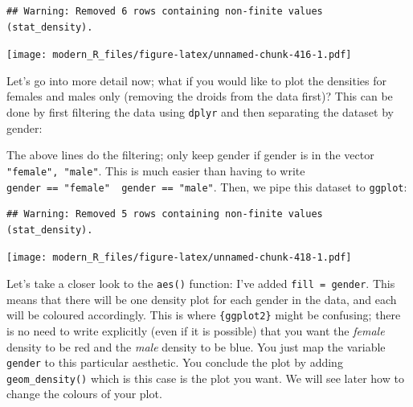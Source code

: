 \documentclass[]{gitbook}
\newenvironment{Shaded}{\begin{snugshade}}{\end{snugshade}}
\newcommand{\DataTypeTok}[1]{\textcolor[rgb]{0.13,0.29,0.53}{#1}}
\newcommand{\KeywordTok}[1]{\textcolor[rgb]{0.13,0.29,0.53}{\textbf{#1}}}
\newcommand{\NormalTok}[1]{#1}
\newcommand{\OperatorTok}[1]{\textcolor[rgb]{0.81,0.36,0.00}{\textbf{#1}}}
\newcommand{\StringTok}[1]{\textcolor[rgb]{0.31,0.60,0.02}{#1}}
\begin{document}
\begin{verbatim}
## Warning: Removed 6 rows containing non-finite values (stat_density).
\end{verbatim}

\texttt{[image: modern\_R\_files/figure-latex/unnamed-chunk-416-1.pdf]}

Let's go into more detail now; what if you would like to plot the densities for females and males
only (removing the droids from the data first)? This can be done by first filtering the data using
\texttt{dplyr} and then separating the dataset by gender:

\begin{Shaded}
\end{Shaded}

The above lines do the filtering; only keep gender if gender is in the vector \texttt{"female",\ "male"}.
This is much easier than having to write \texttt{gender\ ==\ "female"\ \textbar{}\ gender\ ==\ "male"}. Then, we pipe
this dataset to \texttt{ggplot}:

\begin{Shaded}
\end{Shaded}

\begin{verbatim}
## Warning: Removed 5 rows containing non-finite values (stat_density).
\end{verbatim}

\texttt{[image: modern\_R\_files/figure-latex/unnamed-chunk-418-1.pdf]}

Let's take a closer look to the \texttt{aes()} function: I've added \texttt{fill\ =\ gender}. This means that
there will be one density plot for each gender in the data, and each will be coloured accordingly.
This is where \texttt{\{ggplot2\}} might be confusing; there is no need to write explicitly (even if it is
possible) that you want the \emph{female} density to be red and the \emph{male} density to be blue. You just
map the variable \texttt{gender} to this particular aesthetic. You conclude the plot by adding
\texttt{geom\_density()} which is this case is the plot you want. We will see later how to change the
colours of your plot.
\end{document}
